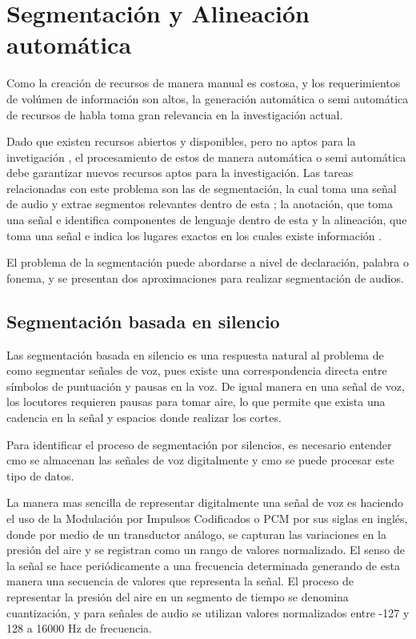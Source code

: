 \chapter{Segmentación y Alineación automática}

Como la creación de recursos de manera manual es costosa, y los requerimientos de volúmen de información son altos, la generación automática o semi automática de recursos de habla toma gran relevancia en la investigación actual.

Dado que existen recursos abiertos y disponibles, pero no aptos para la invetigación , el procesamiento de estos de manera automática o semi automática debe garantizar nuevos recursos aptos para la investigación. Las tareas relacionadas con este problema son las de segmentación, la cual toma una señal de audio y extrae segmentos relevantes dentro de esta ; la anotación, que toma una señal e identifica componentes de lenguaje dentro de esta y la alineación, que toma una señal e indica los lugares exactos en los cuales existe  información .

El problema de la segmentación puede abordarse a nivel de declaración, palabra o fonema, y se presentan dos aproximaciones para realizar segmentación de audios.

\section{Segmentación basada en silencio}

Las segmentación basada en silencio es una respuesta natural al problema de como segmentar señales de voz, pues existe una correspondencia directa entre símbolos de puntuación y pausas en la voz. De igual manera en una señal de voz, los locutores requieren pausas para tomar aire, lo que permite que exista una cadencia en la señal y espacios donde realizar los cortes.

Para identificar el proceso de segmentación por silencios, es necesario entender cmo se almacenan las señales de voz digitalmente y cmo se puede procesar este tipo de datos.

La manera mas sencilla de representar digitalmente una señal de voz es haciendo el uso de la Modulación por Impulsos Codificados o PCM por sus siglas en inglés, donde por medio de un transductor análogo, se capturan las variaciones en la presión del aire y se registran como un rango de valores normalizado. El senso de la señal se hace periódicamente a una frecuencia determinada generando de esta manera una secuencia de valores que representa la señal. El proceso de representar la presión del aire en un segmento de tiempo se denomina cuantización, y para señales de audio se utilizan valores normalizados entre -127 y 128  a 16000 Hz de frecuencia.


